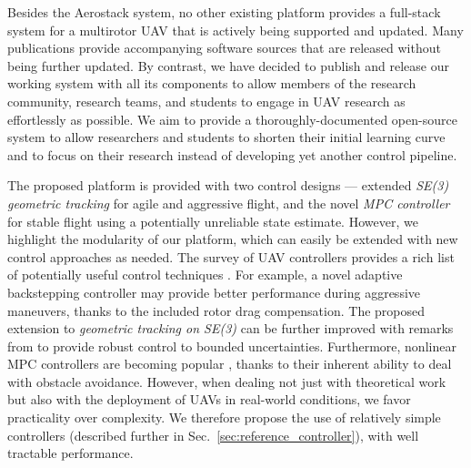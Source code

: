 \documentclass[a4paper,11pt,titlepage,twoside]{book}
\newcommand{\refsec}[1]{Sec.~\ref{#1}}
\begin{document}
Besides the Aerostack system, no other existing platform provides a full-stack system for a multirotor \ac{UAV} that is actively being supported and updated.
Many publications provide accompanying software sources that are released without being further updated.
By contrast, we have decided to publish and release our working system with all its components to allow members of the research community, research teams, and students to engage in \ac{UAV} research as effortlessly as possible.
We aim to provide a thoroughly-documented open-source system to allow researchers and students to shorten their initial learning curve and to focus on their research instead of developing yet another control pipeline.

The proposed platform is provided with two control designs --- extended \emph{SE(3) geometric tracking} \cite{lee2010geometric} for agile and aggressive flight, and the novel \emph{MPC controller} for stable flight using a potentially unreliable state estimate.
However, we highlight the modularity of our platform, which can easily be extended with new control approaches as needed.
The survey of UAV controllers provides a rich list of potentially useful control techniques \cite{nascimento2019position}.
For example, a novel adaptive backstepping controller \cite{zhang2019robust, labbadi2019robust} may provide better performance during aggressive maneuvers, thanks to the included rotor drag compensation.
The proposed extension to \emph{geometric tracking on SE(3)} \cite{lee2010geometric} can be further improved with remarks from \cite{lee2013nonlinear} to provide robust control to bounded uncertainties.
Furthermore, nonlinear \ac{MPC} controllers are becoming popular \cite{nascimento2019nmpc, pereira2019nonlinear, kamel2017robust}, thanks to their inherent ability to deal with obstacle avoidance.
However, when dealing not just with theoretical work but also with the deployment of \acp{UAV} in real-world conditions, we favor practicality over complexity.
We therefore propose the use of relatively simple controllers (described further in \refsec{sec:reference_controller}), with well tractable performance.
\end{document}
